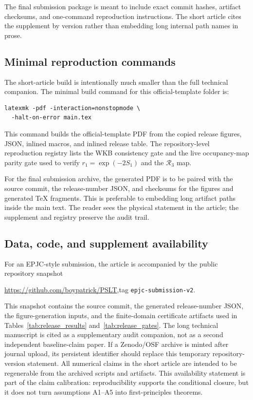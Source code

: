 \documentclass[pdflatex,sn-mathphys-num,iicol]{sn-jnl}
\newcommand{\Rthree}{\mathcal{R}_3}
\begin{document}
The final submission package is meant to include exact commit hashes, artifact checksums, and one-command reproduction instructions.
The short article cites the supplement by version rather than embedding long internal path names in prose.

\subsection{Minimal reproduction commands}

The short-article build is intentionally much smaller than the full technical companion.
The minimal build command for this official-template folder is:
\begin{verbatim}
latexmk -pdf -interaction=nonstopmode \
  -halt-on-error main.tex
\end{verbatim}
This command builds the official-template PDF from the copied release figures, JSON, inlined macros, and inlined release table.
The repository-level reproduction registry lists the WKB consistency gate and the live occupancy-map parity gate used to verify \(r_1=\exp(-2S_1)\) and the \(\Rthree\) map.

For the final submission archive, the generated PDF is to be paired with the source commit, the release-number JSON, and checksums for the figures and generated TeX fragments.
This is preferable to embedding long artifact paths inside the main text.
The reader sees the physical statement in the article; the supplement and registry preserve the audit trail.

\subsection{Data, code, and supplement availability}

For an EPJC-style submission, the article is accompanied by the public repository snapshot
\begin{center}
\url{https://github.com/boypatrick/PSLT},\qquad tag \texttt{epjc-submission-v2}.
\end{center}
This snapshot contains the source commit, the generated release-number JSON, the figure-generation inputs, and the finite-domain certificate artifacts used in Tables~\ref{tab:release_results} and~\ref{tab:release_gates}.
The long technical manuscript is cited as a supplementary audit companion, not as a second independent baseline-claim paper.
If a Zenodo/OSF archive is minted after journal upload, its persistent identifier should replace this temporary repository-version statement.
All numerical claims in the short article are intended to be regenerable from the archived scripts and artifacts.
This availability statement is part of the claim calibration: reproducibility supports the conditional closure, but it does not turn assumptions A1--A5 into first-principles theorems.
\end{document}
